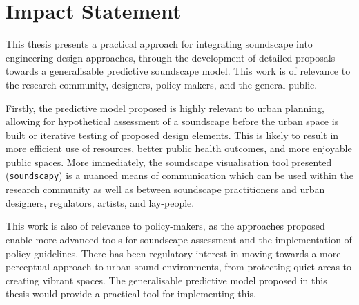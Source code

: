 \documentclass[oneside,fontsize=11pt,titlepage,chapterprefix=true
]{scrbook}
\begin{document}


\chapter*{Impact Statement}
This thesis presents a practical approach for integrating soundscape into engineering design approaches, through the development of detailed proposals towards a generalisable predictive soundscape model. This work is of relevance to the research community, designers, policy-makers, and the general public. 

Firstly, the predictive model proposed is highly relevant to urban planning, allowing for hypothetical assessment of a soundscape before the urban space is built or iterative testing of proposed design elements. This is likely to result in more efficient use of resources, better public health outcomes, and more enjoyable public spaces. More immediately, the soundscape visualisation tool presented (\texttt{soundscapy}) is a nuanced means of communication which can be used within the research community as well as between soundscape practitioners and urban designers, regulators, artists, and lay-people.

This work is also of relevance to policy-makers, as the approaches proposed enable more advanced tools for soundscape assessment and the implementation of policy guidelines. There has been regulatory interest in moving towards a more perceptual approach to urban sound environments, from protecting quiet areas to creating vibrant spaces. The generalisable predictive model proposed in this thesis would provide a practical tool for implementing this. 
\end{document}
